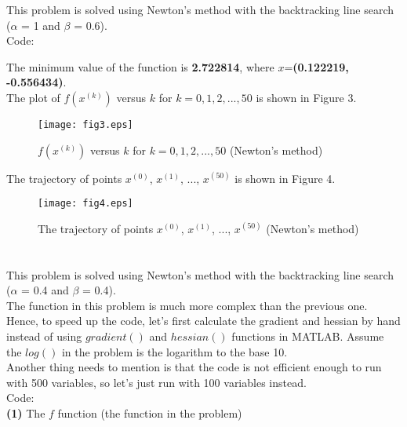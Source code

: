 \documentclass[12pt]{article}
\begin{document}
This problem is solved using Newton's method with the backtracking line search ($\alpha$ = 1 and $\beta$ = 0.6).\\

\noindent Code:



\bigskip\noindent The minimum value of the function is \textbf{2.722814}, where $x$=\textbf{(0.122219, -0.556434)}.\\

\noindent The plot of $f(x^{(k)})$ versus $k$ for $k=0,1,2,...,50$ is shown in Figure 3.

\begin{figure}[!htbp]
	\centering
	\texttt{[image: fig3.eps]}      
	\caption{$f(x^{(k)})$ versus $k$ for $k=0,1,2,...,50$ (Newton's method)}
\end{figure}

\noindent The trajectory of points $x^{(0)}$, $x^{(1)}$, ..., $x^{(50)}$ is shown in Figure 4.

\begin{figure}[!htbp]
	\centering
	\texttt{[image: fig4.eps]}      
	\caption{The trajectory of points $x^{(0)}$, $x^{(1)}$, ..., $x^{(50)}$ (Newton's method)}
\end{figure}

\section{}

This problem is solved using Newton's method with the backtracking line search ($\alpha$ = 0.4 and $\beta$ = 0.4).\\

\noindent The function in this problem is much more complex than the previous one. Hence, to speed up the code, let's first calculate the gradient and hessian by hand instead of using $gradient()$ and $hessian()$ functions in MATLAB. Assume the $log()$ in the problem is the logarithm to the base 10.\\

\noindent Another thing needs to mention is that the code is not efficient enough to run with 500 variables, so let's just run with 100 variables instead.\\

\noindent Code:\\

\noindent\textbf{(1)} The $f$ function (the function in the problem)
\end{document}
